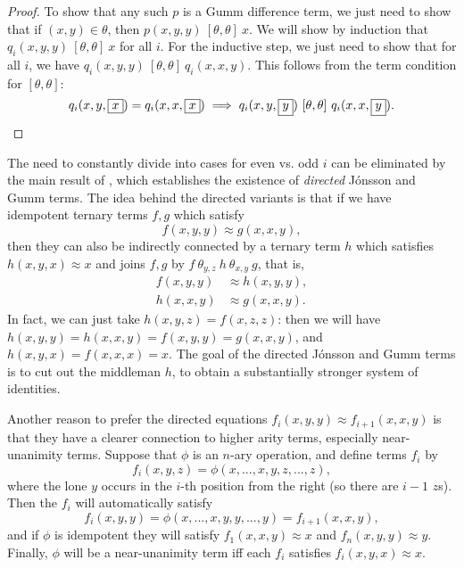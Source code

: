 \begin{appendices}
\begin{proof}
To show that any such $p$ is a Gumm difference term, we just need to show that if $(x,y) \in \theta$, then $p(x,y,y)\ [\theta,\theta]\ x$. We will show by induction that $q_i(x,y,y)\ [\theta,\theta]\ x$ for all $i$. For the inductive step, we just need to show that for all $i$, we have $q_i(x,y,y)\ [\theta,\theta]\ q_i(x,x,y)$. This follows from the term condition for $[\theta,\theta]$:
\[
q_i(x,y,\boxed{x}) = q_i(x,x,\boxed{x}) \implies q_i(x,y,\boxed{y})\ [\theta,\theta]\ q_i(x,x,\boxed{y}).\qedhere
\]
\end{proof}

The need to constantly divide into cases for even vs. odd $i$ can be eliminated by the main result of \cite{directed-gumm}, which establishes the existence of \emph{directed} J\'onsson and Gumm terms. The idea behind the directed variants is that if we have idempotent ternary terms $f,g$ which satisfy
\[
f(x,y,y) \approx g(x,x,y),
\]
then they can also be indirectly connected by a ternary term $h$ which satisfies $h(x,y,x) \approx x$ and joins $f,g$ by $f\ \theta_{y,z}\ h\ \theta_{x,y}\ g$, that is,
\begin{align*}
f(x,y,y) &\approx h(x,y,y),\\
h(x,x,y) &\approx g(x,x,y).
\end{align*}
In fact, we can just take $h(x,y,z) = f(x,z,z)$: then we will have $h(x,y,y) = h(x,x,y) = f(x,y,y) = g(x,x,y)$, and $h(x,y,x) = f(x,x,x) = x$. The goal of the directed J\'onsson and Gumm terms is to cut out the middleman $h$, to obtain a substantially stronger system of identities.

Another reason to prefer the directed equations $f_i(x,y,y) \approx f_{i+1}(x,x,y)$ is that they have a clearer connection to higher arity terms, especially near-unanimity terms. Suppose that $\phi$ is an $n$-ary operation, and define terms $f_i$ by
\[
f_i(x,y,z) = \phi(x,...,x,y,z,...,z),
\]
where the lone $y$ occurs in the $i$-th position from the right (so there are $i-1$ $z$s). Then the $f_i$ will automatically satisfy
\[
f_i(x,y,y) = \phi(x,...,x,y,y,...,y) = f_{i+1}(x,x,y),
\]
and if $\phi$ is idempotent they will satisfy $f_1(x,x,y) \approx x$ and $f_n(x,y,y) \approx y$. Finally, $\phi$ will be a near-unanimity term iff each $f_i$ satisfies $f_i(x,y,x) \approx x$.


\end{appendices}
